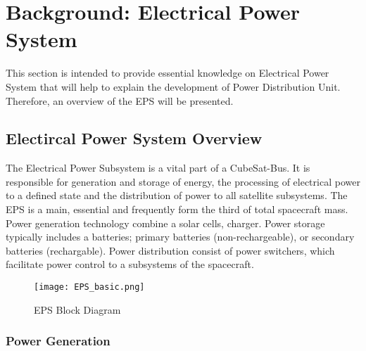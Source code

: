 \chapter{Background: Electrical Power System  \label{cha:chapter2}}
This section is intended to provide essential knowledge on Electrical Power System that will help to explain the development of Power Distribution Unit.
Therefore, an overview of the EPS will be presented. 

\section{Electircal Power System Overview \label{sec:tech}}
The Electrical Power Subsystem is a vital part of a CubeSat-Bus. It is responsible for generation and storage of energy, the processing of electrical power to a defined state and the distribution of power to all satellite subsystems. The EPS is a main, essential and frequently form the third of total spacecraft mass. Power generation technology combine a solar cells, charger. Power storage typically includes a batteries; primary batteries (non-rechargeable), or secondary batteries (rechargable). Power distribution consist of power switchers, which facilitate power control to a subsystems of the spacecraft.



	\begin{figure}[h]
		\centering
		\texttt{[image: EPS\_basic.png]}
			\caption{EPS Block Diagram}
			\label{fig: EPS}
	\end{figure}

\subsection{Power Generation \label{sec:tech}}



